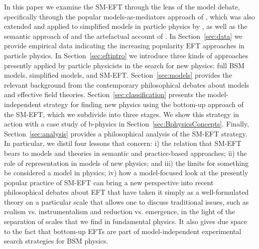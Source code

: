 In this paper we examine the SM-EFT through the lens of the model debate, specifically through the popular models-as-mediators approach of \citet{morganmorrison}, which was also extended and applied to simplified models in particle physics by \citet{mccoymassimi}, as well as the semantic approach of \citet{hartmann1999} and the artefactual account of \citet{knuuttila2011}. 
In Section~\ref{sec:data} we provide empirical data indicating the increasing popularity EFT approaches in particle physics. 
In Section~\ref{sec:eftintro} we introduce three kinds of approaches presently applied by particle physicists in the search for new physics: full BSM models, simplified models, and SM-EFT. 
Section~\ref{sec:models} provides the relevant background from the contemporary philosophical debates about models and effective field theories. 
Section~\ref{sec:classification} presents the model-independent strategy for finding new physics using the bottom-up approach of the SM-EFT, which we subdivide into three stages.
We show this strategy in action with a case study of b-physics in Section~\ref{sec:BphysicsConcepts}. 
Finally, Section~\ref{sec:analysis} provides a philosophical analysis of the SM-EFT strategy.  
In particular, we distil four lessons that concern: i) the relation that SM-EFT bears to models and theories in semantic and practice-based approaches; ii) the role of representation in models of new physics; and iii) the limits for something be considered a model in physics; iv) how a model-focused look at the presently popular practice of SM-EFT can bring a new perspective into recent philosophical debates about EFT that have taken it simply as a well-formulated theory on a particular scale that allows one to discuss traditional issues, such as realism vs. instrumentalism and reduction vs. emergence, in the light of the separation of scales that we find in fundamental physics. It also gives due space to the fact that bottom-up EFTs are part of model-independent experimental search strategies for BSM physics.
